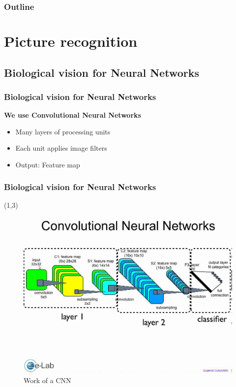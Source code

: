 \documentclass{beamer} %
\begin{document}
\begin{frame}
\frametitle{Outline}
\tableofcontents
\end{frame}








\section{Picture recognition}

\subsection{Biological vision for Neural Networks}
\begin{frame}
\frametitle{Biological vision for Neural Networks}

\textbf{We use Convolutional Neural Networks}
\newline
\pause
\begin{itemize}

	\setlength\itemsep{1em}
	\item Many layers of processing units
	\pause	
	\item Each unit applies image filters
	\pause
	\item Output: Feature map
\end{itemize}



\end{frame}

\begin{frame}
\frametitle{Biological vision for Neural Networks}
\begin{textblock}{5}(1,3)
	\begin{figure}
	\includegraphics[scale=0.3]{figures/convolution.jpg}
	\caption{Work of a CNN}
	\end{figure}
 \end{textblock} 

\end{frame}
\end{document}
